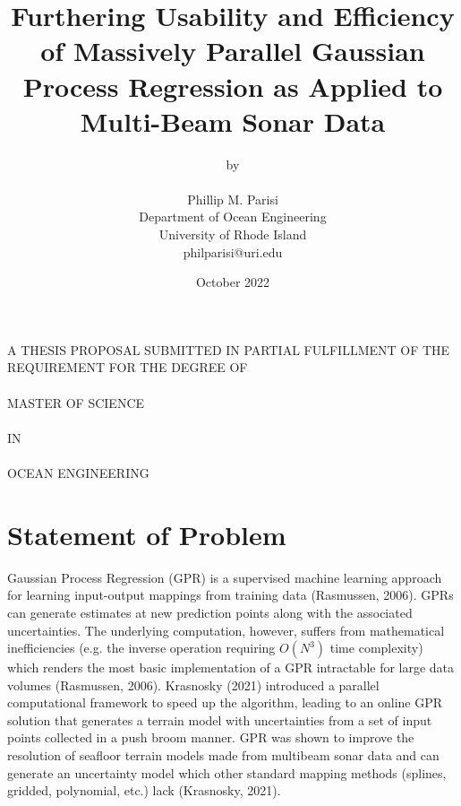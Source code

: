 \documentclass{article}
\title{Furthering Usability and Efficiency of Massively Parallel Gaussian Process Regression as Applied to Multi-Beam Sonar Data}
\author{
    by\\~\\
    Phillip M. Parisi\\
    Department of Ocean Engineering\\
    University of Rhode Island\\
    philparisi@uri.edu}
\date{October 2022}
\begin{document}

\maketitle %
\thispagestyle{empty}

\begin{center}
\bigskip \bigskip \bigskip \bigskip \bigskip \bigskip \bigskip \bigskip
A THESIS PROPOSAL SUBMITTED IN PARTIAL FULFILLMENT OF THE REQUIREMENT FOR THE DEGREE OF \\~\\ MASTER OF SCIENCE \\~\\ IN \\~\\ OCEAN ENGINEERING
\end{center}
\pagebreak



\section{Statement of Problem}
Gaussian Process Regression (GPR) is a supervised machine learning approach for learning input-output mappings from training data (Rasmussen, 2006). GPRs can generate estimates at new prediction points along with the associated uncertainties.  The underlying computation, however, suffers from mathematical inefficiencies (e.g. the inverse operation requiring $O({N^3})$ time complexity) which renders the most basic implementation of a GPR intractable for large data volumes (Rasmussen, 2006). Krasnosky (2021) introduced a parallel computational framework to speed up the algorithm, leading to an online GPR solution that generates a terrain model with uncertainties from a set of input points collected in a push broom manner. GPR was shown to improve the resolution of seafloor terrain models made from multibeam sonar data and can generate an uncertainty model which other standard mapping methods (splines, gridded, polynomial, etc.) lack (Krasnosky, 2021).
\end{document}
